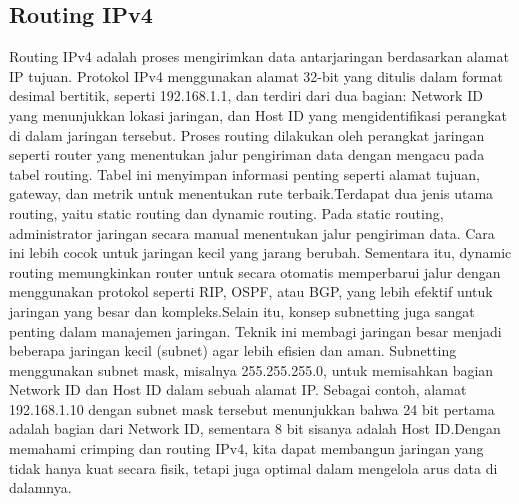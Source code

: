 \subsection*{Routing IPv4}
Routing IPv4 adalah proses mengirimkan data antarjaringan berdasarkan alamat IP tujuan. Protokol IPv4 menggunakan alamat 32-bit yang ditulis dalam format desimal bertitik, seperti 192.168.1.1, dan terdiri dari dua bagian: Network ID yang menunjukkan lokasi jaringan, dan Host ID yang mengidentifikasi perangkat di dalam jaringan tersebut. Proses routing dilakukan oleh perangkat jaringan seperti router yang menentukan jalur pengiriman data dengan mengacu pada tabel routing. Tabel ini menyimpan informasi penting seperti alamat tujuan, gateway, dan metrik untuk menentukan rute terbaik.Terdapat dua jenis utama routing, yaitu static routing dan dynamic routing. Pada static routing, administrator jaringan secara manual menentukan jalur pengiriman data. Cara ini lebih cocok untuk jaringan kecil yang jarang berubah. Sementara itu, dynamic routing memungkinkan router untuk secara otomatis memperbarui jalur dengan menggunakan protokol seperti RIP, OSPF, atau BGP, yang lebih efektif untuk jaringan yang besar dan kompleks.Selain itu, konsep subnetting juga sangat penting dalam manajemen jaringan. Teknik ini membagi jaringan besar menjadi beberapa jaringan kecil (subnet) agar lebih efisien dan aman. Subnetting menggunakan subnet mask, misalnya 255.255.255.0, untuk memisahkan bagian Network ID dan Host ID dalam sebuah alamat IP. Sebagai contoh, alamat 192.168.1.10 dengan subnet mask tersebut menunjukkan bahwa 24 bit pertama adalah bagian dari Network ID, sementara 8 bit sisanya adalah Host ID.Dengan memahami crimping dan routing IPv4, kita dapat membangun jaringan yang tidak hanya kuat secara fisik, tetapi juga optimal dalam mengelola arus data di dalamnya.

